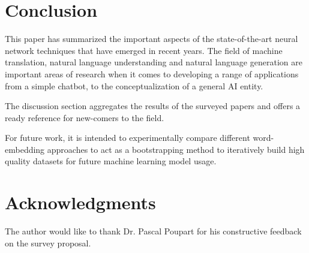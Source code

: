 \documentclass[11pt,a4paper]{article}
\begin{document}


\section{Conclusion} %
\label{sec:conclusion}

  This paper has summarized the important aspects of the state-of-the-art neural network techniques that have emerged in recent years. The field of machine translation, natural language understanding and natural language generation are important areas of research when it comes to developing a range of applications from a simple chatbot, to the conceptualization of a general AI entity.

  The discussion section aggregates the results of the surveyed papers and offers a ready reference for new-comers to the field. 

  For future work, it is intended to experimentally compare different word-embedding approaches to act as a bootstrapping method to iteratively build high quality datasets for future machine learning model usage.



\section{Acknowledgments} %
\label{sec:acknowledgments}

  The author would like to thank Dr. Pascal Poupart for his constructive feedback on the survey proposal.





\end{document}
